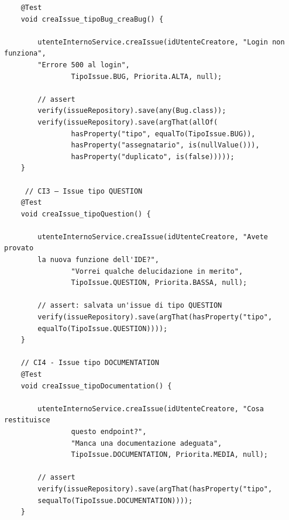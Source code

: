 \begin{listing}[!ht]
\begin{verbatim}
    @Test
    void creaIssue_tipoBug_creaBug() {

        utenteInternoService.creaIssue(idUtenteCreatore, "Login non funziona", 
        "Errore 500 al login",
                TipoIssue.BUG, Priorita.ALTA, null);

        // assert
        verify(issueRepository).save(any(Bug.class));
        verify(issueRepository).save(argThat(allOf(
                hasProperty("tipo", equalTo(TipoIssue.BUG)),
                hasProperty("assegnatario", is(nullValue())),
                hasProperty("duplicato", is(false)))));
    }

     // CI3 — Issue tipo QUESTION
    @Test
    void creaIssue_tipoQuestion() {

        utenteInternoService.creaIssue(idUtenteCreatore, "Avete provato 
        la nuova funzione dell'IDE?",
                "Vorrei qualche delucidazione in merito",
                TipoIssue.QUESTION, Priorita.BASSA, null);

        // assert: salvata un'issue di tipo QUESTION
        verify(issueRepository).save(argThat(hasProperty("tipo", 
        equalTo(TipoIssue.QUESTION))));
    }

    // CI4 - Issue tipo DOCUMENTATION
    @Test
    void creaIssue_tipoDocumentation() {

        utenteInternoService.creaIssue(idUtenteCreatore, "Cosa restituisce 
                questo endpoint?",
                "Manca una documentazione adeguata",
                TipoIssue.DOCUMENTATION, Priorita.MEDIA, null);

        // assert
        verify(issueRepository).save(argThat(hasProperty("tipo", 
        sequalTo(TipoIssue.DOCUMENTATION))));
    }


\end{verbatim}
\end{listing}

\clearpage

